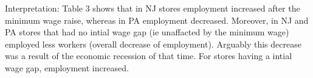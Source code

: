 \documentclass[11pt]{article}
\begin{document}
Interpretation: Table 3 shows that in NJ stores employment increased after the minimum wage raise, whereas in PA employment decreased. Moreover, in NJ and PA stores that had no intial wage gap (ie unaffacted by the minimum wage) employed less workers (overall decrease of employment). Arguably this decrease was a result of the economic recession of that time. For stores having a intial wage gap, employment increased.


\end{document}
